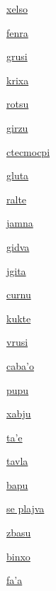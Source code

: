 {\hyperlink{val:xelso}{xelso}}{}{}{}

{\hyperlink{val:fenra}{fenra}}{}{}{}

{\hyperlink{val:grusi}{grusi}}{}{}{}

{\hyperlink{val:krixa}{krixa}}{}{}{}

{\hyperlink{val:rotsu}{rotsu}}{}{}{}

{\hyperlink{val:girzu}{girzu}}{}{}{}

{\hyperlink{val:ctecmocpi}{ctecmocpi}}{}{}{}

{\hyperlink{val:gluta}{gluta}}{}{}{}

{\hyperlink{val:ralte}{ralte}}{}{}{}

{\hyperlink{val:jamna}{jamna}}{}{}{}

{\hyperlink{val:gidva}{gidva}}{}{}{}

{\hyperlink{val:jgita}{jgita}}{}{}{}

{\hyperlink{val:curnu}{curnu}}{}{}{}

{\hyperlink{val:kukte}{kukte}}{}{}{}

{\hyperlink{val:vrusi}{vrusi}}{}{}{}

{\hyperlink{val:cabaho}{caba'o}}{}{}{}

{\hyperlink{val:pupu}{pupu}}{}{}{}

{\hyperlink{val:xabju}{xabju}}{}{}{}

{\hyperlink{val:tahe}{ta'e}}{}{}{}

{\hyperlink{val:tavla}{tavla}}{}{}{}

{\hyperlink{val:bapu}{bapu}}{}{}{}

{\hyperlink{val:plajva}{se plajva}}{}{}{}

{\hyperlink{val:zbasu}{zbasu}}{}{}{}

{\hyperlink{val:binxo}{binxo}}{}{}{}

{\hyperlink{val:faha}{fa'a}}{}{}{}

